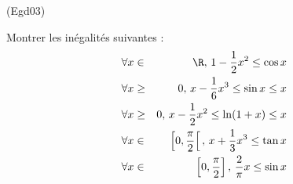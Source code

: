 \begin{tiny}(Egd03)\end{tiny}
Montrer les in{\'e}galit{\'e}s suivantes :
\begin{eqnarray*}
\forall x &\in &\R,\, 1-\frac{1}{2}x^{2}\leq \cos x \\
\forall x &\geq &0,\,x-\frac{1}{6}x^{3}\leq \sin x\leq x \\
\forall x &\geq &0,\,x-\frac{1}{2}x^{2}\leq \ln (1+x)\leq x \\
\forall x &\in &\left[ 0,\frac{\pi }{2}\right[
,\,x+\frac{1}{3}x^{3}\leq
\tan x \\
\forall x &\in &\left[ 0,\frac{\pi }{2}\right] ,\,\frac{2}{\pi
}x\leq \sin x
\end{eqnarray*}
